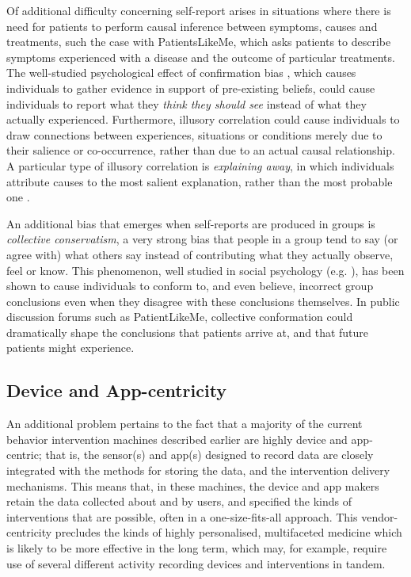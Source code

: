 \documentclass{sig-alternate}
\begin{document}
Of additional difficulty concerning self-report arises in situations
where there is need for patients to perform causal inference between
symptoms, causes and treatments, such the case with PatientsLikeMe,
which asks patients to describe symptoms experienced with a disease
and the outcome of particular treatments.  The well-studied
psychological effect of confirmation bias \cite{confirmationbias},
which causes individuals to gather evidence in support of pre-existing
beliefs, could cause individuals to report what they \emph{think they
  should see} instead of what they actually experienced.  Furthermore,
illusory correlation \cite{chapman1969illusory} could cause
individuals to draw connections between experiences, situations or
conditions merely due to their salience or co-occurrence, rather than
due to an actual causal relationship. A particular type of illusory
correlation is \emph{explaining away}, in which individuals attribute
causes to the most salient explanation, rather than the most probable
one \cite{gilovich1983biased}.

An additional bias that emerges when self-reports are produced in
groups is \emph{collective conservatism}, a very strong bias that
people in a group tend to say (or agree with) what others say instead
of contributing what they actually observe, feel or know.  This
phenomenon, well studied in social psychology
(e.g. \cite{aronson2003readings}), has been shown to cause individuals
to conform to, and even believe, incorrect group conclusions even when
they disagree with these conclusions themselves.  In public discussion
forums such as PatientLikeMe, collective conformation could dramatically
shape the conclusions that patients arrive at, and that future patients
might experience.

\subsection{Device and App-centricity}

An additional problem pertains to the fact that a majority of the
current behavior intervention machines described earlier are highly
device and app-centric; that is, the sensor(s) and app(s) designed to
record data are closely integrated with the methods for storing the
data, and the intervention delivery mechanisms.  This means that, in
these machines, the device and app makers retain the data collected
about and by users, and specified the kinds of interventions that are
possible, often in a one-size-fits-all approach.  This
vendor-centricity precludes the kinds of highly personalised,
multifaceted medicine which is likely to be more effective in the long
term, which may, for example, require use of several different
activity recording devices and interventions in tandem.
\end{document}
